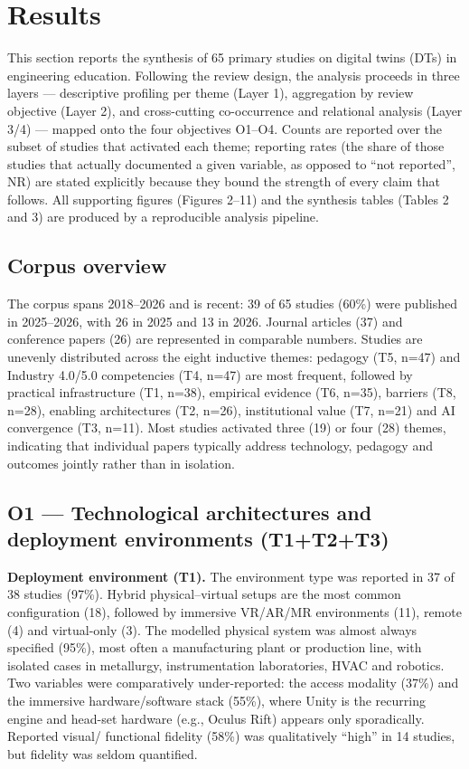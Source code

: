 \section{Results}\label{results}

This section reports the synthesis of 65 primary studies on digital twins (DTs)
in engineering education. Following the review design, the analysis proceeds in
three layers --- descriptive profiling per theme (Layer 1), aggregation by review
objective (Layer 2), and cross-cutting co-occurrence and relational analysis
(Layer 3/4) --- mapped onto the four objectives O1--O4. Counts are reported over
the subset of studies that activated each theme; reporting rates (the share of
those studies that actually documented a given variable, as opposed to ``not
reported'', NR) are stated explicitly because they bound the strength of every
claim that follows. All supporting figures (Figures 2--11) and the
synthesis tables (Tables 2 and 3) are produced by a reproducible analysis pipeline.

\subsection{Corpus overview}\label{corpus-overview}

The corpus spans 2018--2026 and is recent: 39 of 65 studies (60\%) were published
in 2025--2026, with 26 in 2025 and 13 in 2026. Journal articles (37) and
conference papers (26) are represented in comparable numbers. Studies are
unevenly distributed across the eight inductive themes: pedagogy (T5, n=47) and
Industry 4.0/5.0 competencies (T4, n=47) are most frequent, followed by
practical infrastructure (T1, n=38), empirical evidence (T6, n=35), barriers
(T8, n=28), enabling architectures (T2, n=26), institutional value (T7, n=21)
and AI convergence (T3, n=11). Most studies activated three (19) or four (28)
themes, indicating that individual papers typically address technology,
pedagogy and outcomes jointly rather than in isolation.

\subsection{O1 --- Technological architectures and deployment environments (T1+T2+T3)}\label{o1-technological-architectures-and-deployment-environments-t1t2t3}

\textbf{Deployment environment (T1).} The environment type was reported in 37 of 38
studies (97\%). Hybrid physical--virtual setups are the most common configuration
(18), followed by immersive VR/AR/MR environments (11), remote (4) and
virtual-only (3). The modelled physical system was almost always specified
(95\%), most often a manufacturing plant or production line, with isolated cases
in metallurgy, instrumentation laboratories, HVAC and robotics. Two variables
were comparatively under-reported: the access modality (37\%) and the immersive
hardware/software stack (55\%), where Unity is the recurring engine and head-set
hardware (e.g., Oculus Rift) appears only sporadically. Reported visual/
functional fidelity (58\%) was qualitatively ``high'' in 14 studies, but fidelity
was seldom quantified.

